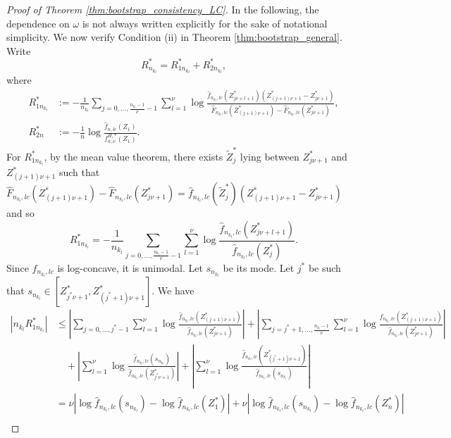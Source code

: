 \documentclass[12pt,letterpaper, twoside, openany]{article}
\theoremstyle{plain}
\begin{document}
\begin{proof}[Proof of Theorem \ref{thm:bootstrap_consistency_LC}]
In the following, the dependence on $\omega$ is not always written explicitly for the sake of notational simplicity.  We now verify Condition (ii) in Theorem \ref{thm:bootstrap_general}. Write
\begin{equation*}
    R_{n_{k_l}}^* = R_{1{n_{k_l}}}^* +R_{2{n_{k_l}}}^*,
\end{equation*}
where
\begin{align*}
R_{1{n_{k_l}}}^* &:=	- \frac{1}{{n_{k_l}}} \sum_{j=0,\ldots,\frac{{n_{k_l}}-1}{\nu} - 1} 
	\sum^\nu_{l=1} \log \frac{\hat{f}_{{n_{k_l}},lc}(Z_{j\nu+l+1}^*)(Z_{(j+1)\nu+1}^* - Z_{j\nu+1}^*)}{\hat{F}_{{n_{k_l}},lc}(Z_{(j+1)\nu+1}^*) - \hat{F}_{{n_{k_l}},lc}(Z_{j\nu+1}^*)},\\
	R_{2n}^* &:= -\frac{1}{n}\log \frac{\hat{f}_{n,lc}(Z_1)}{f^{H,*}_{n,\nu}(Z_1)}.
\end{align*}
For $R_{1{n_{k_l}}}^*$, by the mean value theorem, there exists $\tilde{Z}^*_j$ lying between $Z_{j\nu+1}^*$ and $Z_{(j+1)\nu+1}^*$ such that $\hat{F}_{{n_{k_l}},lc}(Z_{(j+1)\nu+1}^*) - \hat{F}_{{n_{k_l}},lc}(Z_{j\nu+1}^*) = \hat{f}_{{n_{k_l}},lc}(\tilde{Z}^*_j)(Z_{(j+1)\nu+1}^* - Z_{j\nu+1}^*)$ and so
	\begin{equation*}
R_{1{n_{k_l}}}^*  = -\frac{1}{{n_{k_l}}}\sum_{j=0,\ldots, \frac{{n_{k_l}}-1}{\nu}-1} \sum^\nu_{l=1} \log \frac{\hat{f}_{n_{k_l},lc}(Z_{j\nu+l+1}^*)}{\hat{f}_{n_{k_l},lc}(Z^*_j)}.
	\end{equation*}
Since $\hat{f}_{n_{k_l},lc}$ is log-concave, it is unimodal. Let $s_{n_{k_l}}$ be its mode. Let $j^*$ be such that $s_{n_{k_l}} \in [Z^*_{j^*\nu+1}, Z^*_{(j^*+1)\nu+1}]$. We have
\begin{align*}
    |n_{k_l} R_{1n_{k_l}}^*| & \leq \left|  \sum_{j=0,\ldots, j^*-1} \sum^\nu_{l=1} \log \frac{\hat{f}_{n_{k_l},lc}(Z_{(j+1)\nu+1}^*)}{\hat{f}_{n_{k_l},lc}(Z_{j\nu+1}^*)}\right| + \left|  \sum_{j=j^*+1,\ldots, \frac{n_{k_l}-1}{\nu}} \sum^\nu_{l=1} \log \frac{\hat{f}_{n_{k_l},lc}(Z_{(j+1)\nu+1}^*)}{\hat{f}_{n_{k_l},lc}(Z_{j\nu+1}^*)}\right| \\
    &\quad + \left| \sum^\nu_{l=1} \log \frac{ \hat{f}_{n_{k_l},lc}(s_{n_{k_l}})}{\hat{f}_{n_{k_l},lc}(Z^*_{j^*\nu+1}) }\right| + 
    \left| \sum^\nu_{l=1} \log \frac{\hat{f}_{n_{k_l},lc}(Z^*_{(j^*+1)\nu+1}) }{ \hat{f}_{n_{k_l},lc}(s_{n_{k_l}})} \right|
    \\
    &= \nu | \log \hat{f}_{n_{k_l},lc}(s_{n_{k_l}}) - \log \hat{f}_{n_{k_l},lc}(Z^*_1)| + 
    \nu | \log \hat{f}_{n_{k_l},lc}(s_{n_{k_l}}) - \log \hat{f}_{n_{k_l},lc}(Z^*_n)| \\

\end{align*}
\end{proof}
\end{document}
